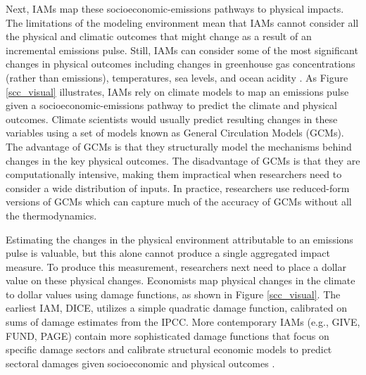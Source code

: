 Next, IAMs map these socioeconomic-emissions pathways to physical impacts. The limitations of the modeling environment mean that IAMs cannot consider all the physical and climatic outcomes that might change as a result of an incremental emissions pulse. Still, IAMs can consider some of the most significant changes in physical outcomes including changes in greenhouse gas concentrations (rather than emissions), temperatures, sea levels, and ocean acidity \citep{sccdatatool}. As Figure \ref{scc_visual} illustrates, IAMs rely on climate models to map an emissions pulse given a socioeconomic-emissions pathway to predict the climate and physical outcomes. Climate scientists would usually predict resulting changes in these variables using a set of models known as General Circulation Models (GCMs). The advantage of GCMs is that they structurally model the mechanisms behind changes in the key physical outcomes. The disadvantage of GCMs is that they are computationally intensive, making them impractical when researchers need to consider a wide distribution of inputs. In practice, researchers use reduced-form versions of GCMs which can capture much of the accuracy of GCMs without all the thermodynamics.

Estimating the changes in the physical environment attributable to an emissions pulse is valuable, but this alone cannot produce a single aggregated impact measure. To produce this measurement, researchers next need to place a dollar value on these physical changes. Economists map physical changes in the climate to dollar values using damage functions, as shown in Figure \ref{scc_visual}. The earliest IAM, DICE, utilizes a simple quadratic damage function, calibrated on sums of damage estimates from the IPCC. More contemporary IAMs (e.g., GIVE, FUND, PAGE) contain more sophisticated damage functions that focus on specific damage sectors and calibrate structural economic models to predict sectoral damages given socioeconomic and physical outcomes \citep{national2017valuing}. 

